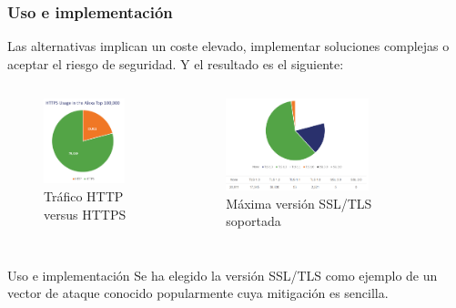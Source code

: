 \begin{frame}[shrink=10]
  \frametitle{Uso e implementación}
  Las alternativas implican un coste elevado, implementar soluciones complejas o aceptar el riesgo de seguridad. Y el resultado es el siguiente:
	\begin{columns}
	\begin{column}{0.3\textwidth}
		\begin{figure}
			\includegraphics[width=0.9\textwidth]{fig/ImplementationHTTPHTTPS}
      \caption{\small{Tráfico HTTP versus HTTPS ~\cite{thesslstore}}}
		\end{figure}
	\end{column}
	\begin{column}{0.7\textwidth}  %
		\begin{figure}
			\includegraphics[width=0.7\textwidth]{fig/ImplementationSSLTLS}
      \caption{\small{Máxima versión SSL/TLS soportada~\cite{thesslstore}}}
		\end{figure}
	\end{column}
	\end{columns}
  \begin{block}{Uso e implementación}
  Se ha elegido la versión SSL/TLS como ejemplo de un vector de ataque conocido popularmente cuya mitigación es sencilla.
  \end{block}
\end{frame}

